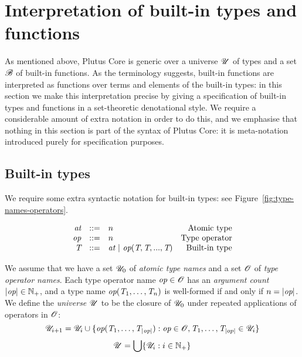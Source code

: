 \section{Interpretation of built-in types and functions}
\label{sec:specify-builtins}
As mentioned above, Plutus Core is generic over a universe $\mathscr{U}$ of types and
a set $\mathscr{B}$ of built-in functions.  As the terminology suggests, built-in
functions are interpreted as functions over terms and elements of the built-in
types: in this section we make this interpretation precise by giving a
specification of built-in types and functions in a set-theoretic denotational
style.  We require a considerable amount of extra notation in order to do this,
and we emphasise that nothing in this section is part of the syntax of Plutus
Core: it is meta-notation introduced purely for specification purposes.


\subsection{Built-in types}
\label{sec:built-in-types}
We require some extra syntactic notation for built-in types: see Figure~\ref{fig:type-names-operators}.

\begin{minipage}{\linewidth}
    \centering
    \[\begin{array}{rclr}
    \textit{at}    & ::= & n & \textrm{Atomic type}\\
     \textit{op}             & ::= & n & \textrm{Type operator}\\
     \textit{T}             & ::= & \textit{at} \ | \ \textit{op}(\textit{T},\textit{T},...,\textit{T}) & \textrm{Built-in type}\\
    \end{array}\]
    \label{fig:type-names-operators}
\end{minipage}

\medskip
\noindent
We assume that we have a set $\mathscr{U}_0$ of \textit{atomic type names} and a set $\mathscr{O}$
of \textit{type operator names}.  Each type operator name $\textit{op} \in \mathscr{O}$ has an
\textit{argument count} $\left| \textit{op} \right| \in \mathbb{N}_{+}$, and a type name $\textit{op}(\textit{T}_1,
\ldots, \textit{T}_n)$ is well-formed if and only if $n = \left| \textit{op} \right|$.  We define
the \textit{universe} $\mathscr{U}$ to be the closure of $\mathscr{U}_0$ under repeated
applications of operators in $\mathscr{O}$:
$$
\mathscr{U}_{i+1} = \mathscr{U}_i \cup \{\textit{op}(\textit{T}_1, \ldots, \textit{T}_{\left| \textit{op} \right|}): \textit{op} \in \mathscr{O}, \textit{T}_1, \ldots, \textit{T}_{\left| op \right|} \in \mathscr{U}_i\}
$$
$$
\mathscr{U} = \bigcup\{\mathscr{U}_i: i \in \mathbb{N}_{+}\}
$$%
%
%
%
%

